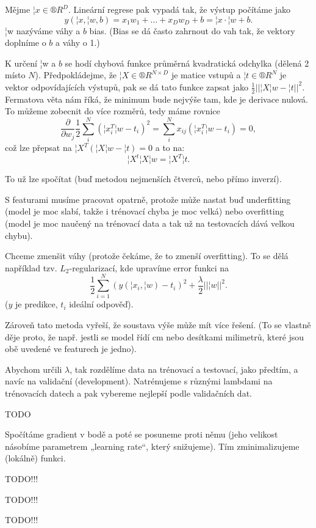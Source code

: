 \documentclass[12pt]{article}					%
\begin{document}
\begin{definice}
	Mějme $¦x \in ®R^D$. Lineární regrese pak vypadá tak, že výstup počítáme jako
	$$ y\left(¦x, ¦w, b\right) = x_1w_1 + … + x_Dw_D + b = ¦x·¦w + b. $$
	¦w nazýváme váhy a $b$ bias. (Bias se dá často zahrnout do vah tak, že vektory doplníme o $b$ a váhy o 1.)

	K určení ¦w a $b$ se hodí chybová funkce průměrná kvadratická odchylka (dělená 2 místo $N$). Předpokládejme, že $¦X \in ®R^{N\times D}$ je matice vstupů a $¦t \in ®R^N$ je vektor odpovídajících výstupů, pak se dá tato funkce zapsat jako $\frac{1}{2}||¦X¦w - ¦t||^2$. Fermatova věta nám říká, že minimum bude nejvýše tam, kde je derivace nulová. To můžeme zobecnit do více rozměrů, tedy máme rovnice
	$$ \frac{\partial}{\partial w_j}\frac{1}{2} \sum_i^N\left(¦x_i^T¦w - t_i\right)^2 = \sum_i^N x_{ij}\left(¦x_i^T¦w - t_i\right) = 0, $$
	což lze přepsat na $¦X^T\left(¦X¦w - ¦t\right) = 0 $ a to na:
	$$ ¦X^t¦X¦w = ¦X^T¦t. $$
	
	To už lze spočítat (buď metodou nejmenších čtverců, nebo přímo inverzí).
\end{definice}

\begin{poznamka}
	S featurami musíme pracovat opatrně, protože může nastat buď underfitting (model je moc slabí, takže i trénovací chyba je moc velká) nebo overfitting (model je moc naučený na trénovací data a tak už na testovacích dává velkou chybu).
\end{poznamka}


\begin{definice}[Regularizace]
	Chceme zmenšit váhy (protože čekáme, že to zmenší overfitting). To se dělá například tzv. $L_2$-regularizací, kde upravíme error funkci na
	$$ \frac{1}{2}\sum_{i=1}^N (y(¦x_i, ¦w) - t_i)^2 + \frac{\lambda}{2}||¦w||^2. $$
	($y$ je predikce, $t_i$ ideální odpověď).

	Zároveň tato metoda vyřeší, že soustava výše může mít více řešení. (To se vlastně děje proto, že např. jestli se model řídí cm nebo desítkami milimetrů, které jsou obě uvedené ve featurech je jedno).
\end{definice}

\begin{poznamka}
	Abychom určili $\lambda$, tak rozdělíme data na trénovací a testovací, jako předtím, a navíc na validační (development). Natrénujeme s různými lambdami na trénovacích datech a pak vybereme nejlepší podle validačních dat.
\end{poznamka}

TODO

\begin{definice}
	Spočítáme gradient v bodě a poté se posuneme proti němu (jeho velikost násobíme parametrem „learning rate“, který snižujeme). Tím zminimalizujeme (lokálně) funkci.
\end{definice}


TODO!!!


TODO!!!


TODO!!!
\end{document}
